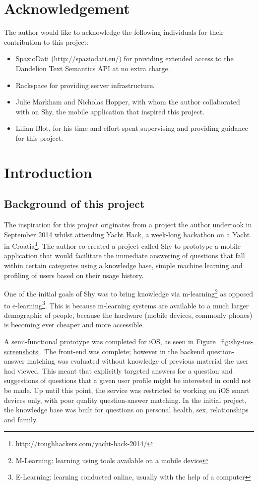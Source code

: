 \documentclass[authoryearcitations]{UoYCSproject}
\begin{document}
\newpage
\chapter*{Acknowledgement}
The author would like to acknowledge the following individuals for their contribution to this project:

\begin{itemize}
  \item SpazioDati (http://spaziodati.eu/) for providing extended access to the Dandelion Text Semantics API at no extra charge.
  \item Rackspace for providing server infrastructure.
  \item Julie Markham and Nicholas Hopper, with whom the author collaborated with on Shy, the mobile application that inspired this project.
  \item Lilian Blot, for his time and effort spent supervising and providing guidance for this project.
\end{itemize}

\newpage
\chapter{Introduction}

\section{Background of this project}

The inspiration for this project originates from a project the author undertook in September 2014 whilst attending Yacht Hack, a week-long hackathon on a Yacht in Croatia\footnote{http://toughhackers.com/yacht-hack-2014/}.  The author co-created a project called Shy to prototype a mobile application that would facilitate the immediate answering of questions that fall within certain categories using a knowledge base, simple machine learning and profiling of users based on their usage history.

One of the initial goals of Shy was to bring knowledge via m-learning\footnote{M-Learning: learning using tools available on a mobile device} as opposed to e-learning\footnote{E-Learning: learning conducted online, usually with the help of a computer}.  This is because m-learning systems are available to a much larger demographic of people, because the hardware (mobile devices, commonly phones) is becoming ever cheaper and more accessible.

A semi-functional prototype was completed for iOS, as seen in Figure~\ref{fig:shy-ios-screenshots}.  The front-end was complete; however in the backend question-answer matching was evaluated without knowledge of previous material the user had viewed.  This meant that explicitly targeted answers for a question and suggestions of questions that a given user profile might be interested in could not be made.  Up until this point, the service was restricted to working on iOS smart devices only, with poor quality question-answer matching.  In the initial project, the knowledge base was built for questions on personal health, sex, relationships and family.
\end{document}
